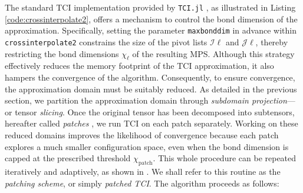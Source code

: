 The standard TCI implementation provided by \texttt{TCI.jl} \cite{TensorCrossInterpolation.jl}, as illustrated in Listing \ref{code:crossinterpolate2}, offers a mechanism to control the bond dimension of the approximation. Specifically, setting the parameter \texttt{maxbonddim} in advance within \texttt{crossinterpolate2} constrains the size of the pivot lists $\mathcal{I}\ell$ and $\mathcal{J}\ell$, thereby restricting the bond dimensions $\chi_\ell$ of the resulting MPS. Although this strategy effectively reduces the memory footprint of the TCI approximation, it also hampers the convergence of the algorithm. Consequently, to ensure convergence, the approximation domain must be suitably reduced. As detailed in the previous section, we partition the approximation domain through \textit{subdomain projection}—or tensor \textit{slicing}. Once the original tensor has been decomposed into subtensors, hereafter called \textit{patches} \footnotemark, we run TCI on each patch separately. Working on these reduced domains improves the likelihood of convergence because each patch explores a much smaller configuration space, even when the bond dimension is capped at the prescribed threshold $\chi_{\text{patch}}$. 
This whole procedure can be repeated iteratively and adaptively, as shown in . We shall refer to this routine as the \textit{patching scheme}, or simply \textit{patched TCI}.
The algorithm proceeds as follows:
\begingroup
\renewcommand{\labelenumi}{(\arabic{enumi})}
